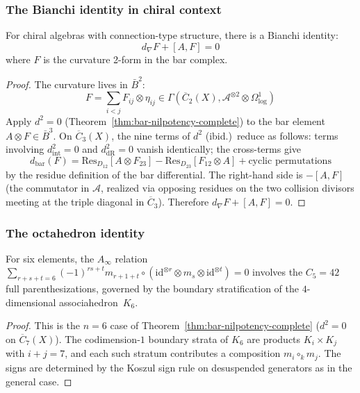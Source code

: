 \subsubsection{The Bianchi identity in chiral context}

\begin{theorem}\label{thm:chiral-bianchi}
For chiral algebras with connection-type structure, there is a Bianchi identity:
\[d_\nabla F + [A, F] = 0\]
where $F$ is the curvature 2-form in the bar complex.
\end{theorem}

\begin{proof}
The curvature lives in $\bar{B}^2$:
\[F = \sum_{i<j} F_{ij} \otimes \eta_{ij} \in \Gamma(\overline{C}_2(X), \mathcal{A}^{\otimes 2} \otimes \Omega^1_{\text{log}})\]
Apply $d^2 = 0$ (Theorem~\ref{thm:bar-nilpotency-complete}) to the bar element $A \otimes F \in \bar{B}^3$.  On $\overline{C}_3(X)$, the nine terms of $d^2$ (ibid.)\ reduce as follows: terms involving $d_{\mathrm{int}}^2 = 0$ and $d_{\mathrm{dR}}^2 = 0$ vanish identically; the cross-terms give
\[d_{\mathrm{bar}}(F) = \mathrm{Res}_{D_{12}}[A \otimes F_{23}] - \mathrm{Res}_{D_{23}}[F_{12} \otimes A] + \text{cyclic permutations}\]
by the residue definition of the bar differential.  The right-hand side is $-[A, F]$ (the commutator in $\mathcal{A}$, realized via opposing residues on the two collision divisors meeting at the triple diagonal in $\overline{C}_3$).  Therefore $d_\nabla F + [A,F] = 0$.
\end{proof}

\subsubsection{The octahedron identity}

\begin{corollary}\label{cor:higher-associahedron-m6}
For six elements, the $A_\infty$ relation $\sum_{r+s+t=6}(-1)^{rs+t}m_{r+1+t}\circ(\mathrm{id}^{\otimes r}\otimes m_s\otimes\mathrm{id}^{\otimes t})=0$ involves the $C_5 = 42$ full parenthesizations, governed by the boundary stratification of the $4$-dimensional associahedron~$K_6$.
\end{corollary}

\begin{proof}
This is the $n=6$ case of Theorem~\ref{thm:bar-nilpotency-complete} ($d^2=0$ on $\overline{C}_7(X)$).  The codimension-$1$ boundary strata of $K_6$ are products $K_i \times K_j$ with $i+j=7$, and each such stratum contributes a composition $m_i \circ_k m_j$.  The signs are determined by the Koszul sign rule on desuspended generators as in the general case.
\end{proof}

